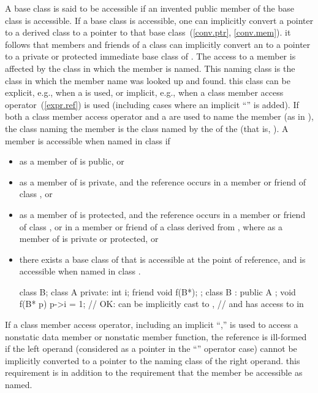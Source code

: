 \pnum
A base class is said to be accessible if an invented public member of the
base class is accessible.
If a base class is accessible, one can implicitly convert a pointer to
a derived class to a pointer to that base class~(\ref{conv.ptr}, \ref{conv.mem}).
\enternote
it follows that
members and friends of a class
can implicitly convert an
to a pointer to a private or protected immediate base class of
.
\exitnote
The access to a member is affected by the class in which the member is
named.
This naming class is the class in which the member name was looked
up and found.
\enternote
this class can be explicit, e.g., when a
is used, or implicit, e.g., when a class member access operator~(\ref{expr.ref}) is used (including cases where an implicit
``''
is
added).
If both a class member access operator and a
are used to name the member (as in
),
the class naming the member is the class named by the
of the
(that is,
).
\exitnote
A member
is accessible
when named in class
if
\begin{itemize}
\item
{}
as a member of
is public, or
\item
{}
as a member of
is private, and the reference
occurs in a member or friend of class
,
or
\item
{}
as a member of
is protected, and the reference
occurs in a member or friend of class
,
or in a member or friend of a class
derived from
,
where
as a member of
is private or protected, or
\item
there exists a base class
of
that is accessible at the point of reference,
and
is accessible when named in class
.
\enterexample

\begin{codeblock}
class B;
class A {
private:
  int i;
  friend void f(B*);
};
class B : public A { };
void f(B* p) {
  p->i = 1;			// OK:  can be implicitly cast to ,
				// and  has access to  in 
}
\end{codeblock}
\exitexampleb
\end{itemize}

\pnum
If a class member access operator, including an implicit
``,''
is used to access a nonstatic data member or nonstatic
member function, the reference is ill-formed if the
left operand (considered as a pointer in the
``''
operator case) cannot be implicitly converted to a
pointer to the naming class of the right operand.
\enternote
this requirement is in addition to the requirement that
the member be accessible as named.
\exitnote

